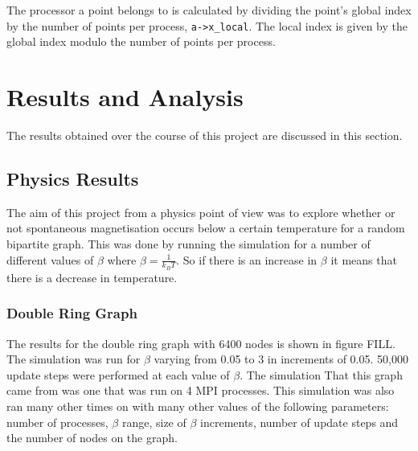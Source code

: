 \documentclass[pdftex,12pt,a4paper]{article}
\begin{document}
The processor a point belongs to is calculated by dividing the point's global index by the number of points per process, \verb|a->x_local|. The local index is given by the global index modulo the number of points per process. 







\newpage

\section{Results and Analysis}

The results obtained over the course of this project are discussed in this section.

\subsection{Physics Results}

The aim of this project from a physics point of view was to explore whether or not spontaneous magnetisation occurs below a certain temperature for a random bipartite graph. This was done by running the simulation for a number of different values of $\beta$ where $\beta = \frac{1}{k_B T}$. So if there is an increase in $\beta$ it means that there is a decrease in temperature.

\subsubsection{Double Ring Graph}

The results for the double ring graph with 6400 nodes is shown in figure FILL. The simulation was run for $\beta$ varying from 0.05 to 3 in increments of 0.05. 50,000 update steps were performed at each value of $\beta$. The simulation That this graph came from was one that was run on 4 MPI processes. This simulation was also ran many other times on with many other values of the following parameters: number of processes, $\beta$ range, size of $\beta$ increments, number of update steps and the number of nodes on the graph. 
\end{document}
